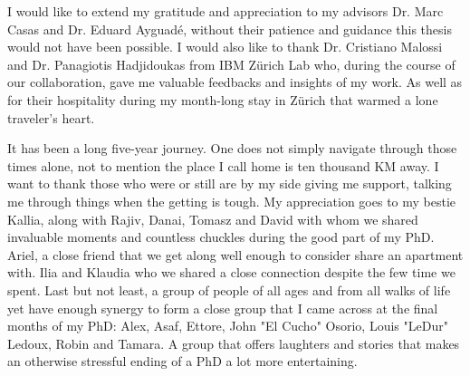 
\begin{acknowledgements}
	I would like to extend my gratitude and appreciation to my advisors Dr.
	Marc Casas and Dr. Eduard Ayguad\'{e}, without their patience and
	guidance this thesis would not have been possible. I would also like to 
	thank Dr. Cristiano Malossi and Dr. Panagiotis Hadjidoukas from IBM Z\"{u}rich 
	Lab who, during the course of our collaboration, gave me valuable feedbacks and 
	insights of my work. As well as for their hospitality during my 
	month-long stay in Z\"{u}rich that warmed a lone traveler's heart.

	It has been a long five-year journey. One does not simply navigate through 
	those times alone, not to mention the place I call home is ten thousand KM 
	away. I want to thank those who were or still are by my side giving me support,
	talking me through things when the getting is tough. My appreciation goes to my 
	bestie Kallia, along with Rajiv, Danai, Tomasz and David with whom we shared invaluable moments and 
	countless chuckles during the good part of my PhD. Ariel, a close friend that we 
	get along well enough to consider share an apartment with. Ilia and Klaudia who we 
	shared a close connection despite the few time we spent. 
	Last but not least, a group of people of all ages and from all walks of life yet
	have enough synergy to form a close group that I came across at the final months 
	of my PhD: Alex, Asaf, Ettore, John "El Cucho" Osorio, Louis "LeDur" Ledoux, Robin and Tamara. A group 
	that offers laughters and stories that makes an otherwise stressful ending of a PhD a 
	lot more entertaining.
	
\end{acknowledgements}
